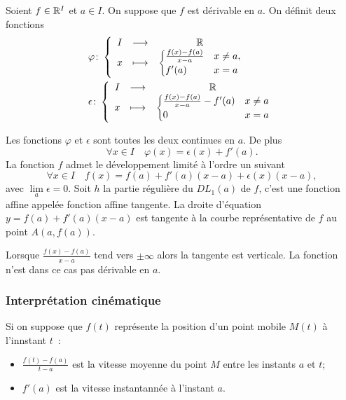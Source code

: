 Soient $f \in \mathbb{R}^I$ et $a \in I$. On suppose que $f$ est dérivable en $a$. On définit deux fonctions
\begin{align}
  &\varphi\colon \left\{\begin{array}{ccc} I & \longrightarrow &\mathbb{R}\\ x & \longmapsto & \begin{cases}\frac{f(x)-f(a)}{x-a} & x \neq a, \\ f'(a) & x=a\end{cases} \end{array} \right. \\ 
  &\epsilon\colon \left\{\begin{array}{ccc} I & \longrightarrow &\mathbb{R}\\ x & \longmapsto & \begin{cases}\frac{f(x)-f(a)}{x-a} -f'(a)& x \neq a \\ 0 & x=a\end{cases} \end{array} \right.
\end{align}
%
\begin{prop}
  Les fonctions $\varphi$ et $\epsilon$ sont toutes les deux continues en $a$. De plus
  \begin{equation}
    \forall x \in I \quad \varphi(x) = \epsilon(x) +f'(a).
  \end{equation}
  La fonction $f$ admet le développement limité à l'ordre un suivant
  \begin{equation}
    \forall x \in I \quad f(x) = f(a) + f'(a)(x-a) + \epsilon(x)(x-a),
  \end{equation}
  avec $\lim\limits_{a} \epsilon=0$. Soit $h$ la partie régulière du $DL_1(a)$ de $f$, c'est une fonction affine appelée fonction affine tangente. La droite d'équation $y=f(a)+f'(a)(x-a)$ est tangente à la courbe représentative de $f$ au point $A(a,f(a))$.
\end{prop}
%
Lorsque $\frac{f(x)-f(a)}{x-a}$ tend vers $\pm\infty$ alors la tangente est verticale. La fonction n'est dans ce cas pas dérivable en $a$.

\subsubsection{Interprétation cinématique}
Si on suppose que $f(t)$ représente la position d'un point mobile $M(t)$ à l'innstant $t$~:
\begin{itemize}
\item $\frac{f(t)-f(a)}{t-a}$ est la vitesse moyenne du point $M$ entre les instants $a$ et $t$;
\item $f'(a)$ est la vitesse instantannée à l'instant $a$.
\end{itemize}

